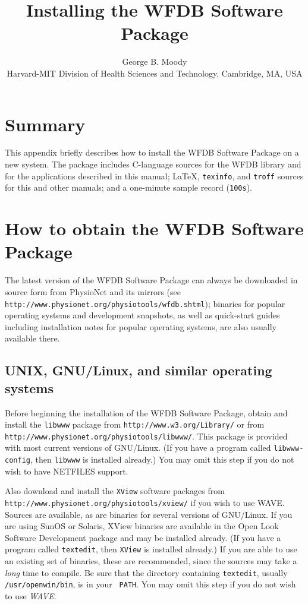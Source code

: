 \documentclass[twoside]{article}
\title{Installing the WFDB Software Package}
\author{George B. Moody\\
Harvard-MIT Division of Health Sciences and Technology, Cambridge, MA, USA}
\date{}
\begin{document}
\setcounter{page}{FIRSTPAGE}

\maketitle

\section*{Summary}
This appendix briefly describes how to install the WFDB Software Package on a
new system.  The package includes C-language sources for the WFDB library and
for the applications described in this manual; \LaTeX{}, {\tt texinfo}, and
{\tt troff} sources for this and other manuals; and a one-minute sample record
({\tt 100s}).

\section*{How to obtain the WFDB Software Package}
The latest version of the WFDB Software Package can always be downloaded in
source form from PhysioNet and its mirrors (see {\tt
http://www.physio\-net.org/physio\-tools/wfdb.shtml}); binaries for popular
operating systems and development snapshots, as well as quick-start guides
including installation notes for popular operating systems, are also usually
available there.

\subsection*{UNIX, GNU/Linux, and similar operating systems}

Before beginning the installation of the WFDB Software Package, obtain and
install the {\tt libwww} package from {\tt http://www.w3.org/Library/} or from
{\tt http://\-www.physio\-net.org/physio\-tools/libwww/}.  This package is
provided with most current versions of GNU/Linux.  (If you have a program
called {\tt libwww-config}, then {\tt libwww} is installed already.)  You may
omit this step if you do not wish to have NETFILES support.

Also download and install the {\tt XView} software packages from {\tt
http://www.\-physio\-net.org/\-physio\-tools/xview/} if you wish to use WAVE.
Sources are available, as are binaries for several versions of GNU/Linux.  If
you are using SunOS or Solaris, XView binaries are available in the Open Look
Software Development package and may be installed already.  (If you have a
program called {\tt textedit}, then {\tt XView} is installed already.) If you
are able to use an existing set of binaries, these are recommended, since the
sources may take a {\em long} time to compile.  Be sure that the directory
containing {\tt textedit}, usually {\tt /usr/openwin/bin}, is in your {\tt
PATH}.  You may omit this step if you do not wish to use {\em WAVE}.
\end{document}
